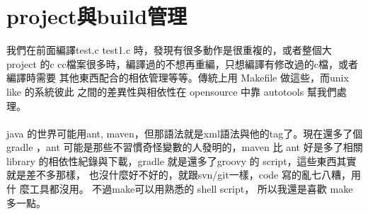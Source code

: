 \chapter{project與build管理}
我們在前面編譯test.c test1.c 時，發現有很多動作是很重複的，或者整個大 project
的c cc檔案很多時，編譯過的不想再重編，只想編譯有修改過的c檔，或者編譯時需要
其他東西配合的相依管理等等。傳統上用 Makefile 做這些，而unix like 的系統彼此
之間的差異性與相依性在 opensource 中靠 autotools 幫我們處理。
\\\\
java 的世界可能用ant, maven，但那語法就是xml語法與他的tag了。現在還多了個
gradle ，ant 可能是那些不習慣奇怪變數的人發明的，maven 比 ant 好是多了相關
library 的相依性紀錄與下載，gradle 就是還多了groovy 的 script，這些東西其實
就是差不多那樣， 也沒什麼好不好的，就跟svn/git一樣，code 寫的亂七八糟，用什
麼工具都沒用。 不過make可以用熟悉的 shell script， 所以我還是喜歡 make 多一點。

